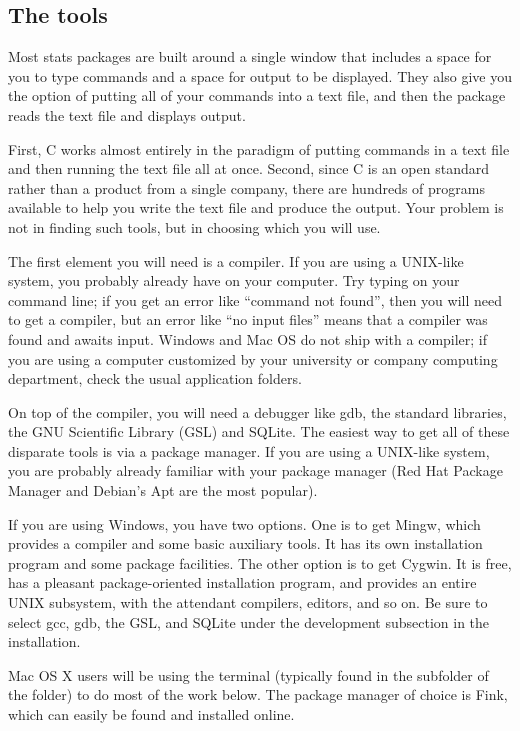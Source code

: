 \documentclass[12pt]{article}
\makeatletter
\def\cind#1{\index{#1@\cinline{#1}}\cinline{#1}}
\makeatother
\begin{document}
\subsection{The tools} 
Most stats packages are built around a single window that includes a
space for you to type commands and a space for output to be displayed.
They also give you the option of putting all of your commands into a
text file, and then the package reads the text file and displays output.

First, C works almost entirely in the paradigm of putting commands in a
text file and then running the text file all at once. Second, since
C is an open standard rather than a product from a single company, there
are hundreds of programs available to help you write the text file and
produce the output. Your problem is not in finding such tools, but in
choosing which you will use.

The first element you will need is a compiler. If you are using
a UNIX-like system, you probably already have \cind{gcc} on your
computer. Try typing  on your command line; if you get an
error like ``command not found'', then you will need to get a compiler,
but an error like ``no input files'' means that a compiler was found
and awaits input. Windows and Mac OS do not ship with a compiler; if you
are using a computer customized by your university or company computing
department, check the usual application folders.

On top of the compiler, you will need a debugger like gdb, the standard
libraries, the GNU Scientific Library (GSL) and SQLite.  The easiest
way to get all of these disparate tools is via a package manager. If
you are using a UNIX-like system, you are probably already familiar with
your package manager (Red Hat Package Manager and Debian's Apt are the
most popular).

If you are using Windows, you have two options. One is to get
Mingw, which provides a compiler and some basic auxiliary tools. It has its
own installation program and some package facilities. The other option is to
get Cygwin.  It is free, has a pleasant package-oriented installation
program, and provides an entire UNIX subsystem, with the attendant
compilers, editors, and so on. Be sure to select gcc, gdb, the GSL,
and SQLite under the development subsection in the installation.

Mac OS X users will be using the terminal (typically found in the
 subfolder of the  folder) to do most of the
work below. The package manager of choice is Fink, which can easily be
found and installed online.
\end{document}
